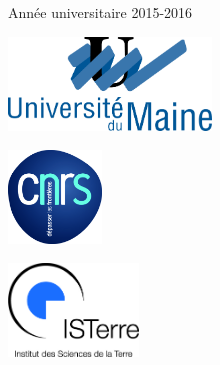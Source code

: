 \documentclass[a4paper,11pt]{report} %
\begin{document}
\begin{titlepage}
\vfill
{\large Année universitaire 2015-2016}\\[3cm] %
 


\begin{minipage}{0.3\textwidth}
	\centering
	\includegraphics[height=2.5cm]{img/univ.png}	
\end{minipage}
\begin{minipage}{0.3\textwidth}
	\centering	
	\includegraphics[height=2.5cm]{img/cnrs.jpg}
\end{minipage}
\begin{minipage}{0.3\textwidth}
	\centering
	\includegraphics[height=2.5cm]{img/isterre.jpg}
\end{minipage}

 



\end{titlepage}


\newpage
%
\vspace{2cm}
%


%





%





\newpage

%

\end{document}
